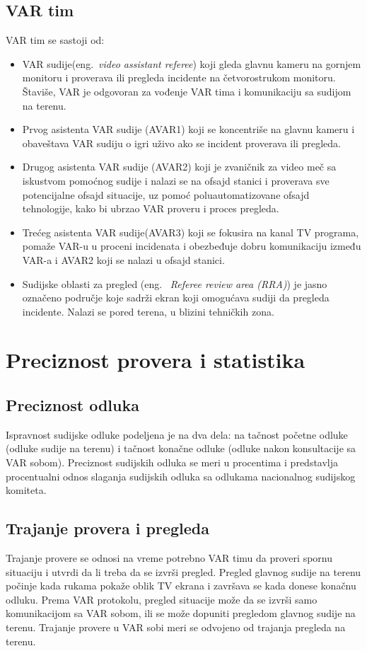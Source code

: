 \documentclass[a4paper]{article}
\begin{document}
\subsection{VAR tim}
VAR tim se sastoji od: 
\begin{itemize}
\item VAR sudije(eng.~{\em video assistant referee}) koji gleda glavnu kameru na gornjem monitoru i proverava ili pregleda incidente na četvorostrukom monitoru. Štaviše, VAR je odgovoran za vođenje VAR tima i komunikaciju sa sudijom na terenu.
\item Prvog asistenta VAR sudije (AVAR1) koji se koncentriše na glavnu kameru i obaveštava VAR sudiju o igri uživo ako se incident proverava ili pregleda.
\item Drugog asistenta VAR sudije (AVAR2) koji je zvaničnik za video meč sa iskustvom pomoćnog sudije i nalazi se na ofsajd stanici i proverava sve potencijalne ofsajd situacije, uz pomoć poluautomatizovane ofsajd tehnologije, kako bi ubrzao VAR proveru i proces pregleda.
\item Trećeg asistenta VAR sudije(AVAR3) koji se fokusira na kanal TV programa, pomaže VAR-u u proceni incidenata i obezbeđuje dobru komunikaciju između VAR-a i AVAR2 koji se nalazi u ofsajd stanici.
\item Sudijske oblasti za pregled (eng. ~{\em Referee review area (RRA)}) je jasno označeno područje koje sadrži ekran koji omogućava sudiji da pregleda incidente. Nalazi se pored terena, u blizini tehničkih zona.
\end{itemize}

\section{Preciznost provera i statistika} 
\subsection{Preciznost odluka} 
Ispravnost sudijske odluke podeljena je na dva dela: na tačnost početne odluke (odluke sudije na terenu) i tačnost konačne odluke (odluke nakon konsultacije sa VAR sobom). Preciznost sudijskih odluka se meri u procentima i predstavlja procentualni odnos slaganja sudijskih odluka sa odlukama nacionalnog sudijskog komiteta. 

\subsection{Trajanje provera i pregleda} 
Trajanje provere se odnosi na vreme potrebno VAR timu da proveri spornu situaciju i utvrdi da li treba da se izvrši pregled. Pregled glavnog sudije na terenu počinje kada rukama pokaže oblik TV ekrana i završava se kada donese konačnu odluku. Prema VAR protokolu, pregled situacije može da se izvrši samo komunikacijom sa VAR sobom, ili se može dopuniti pregledom glavnog sudije na terenu. Trajanje provere u VAR sobi meri se odvojeno od trajanja pregleda na terenu.
\end{document}
